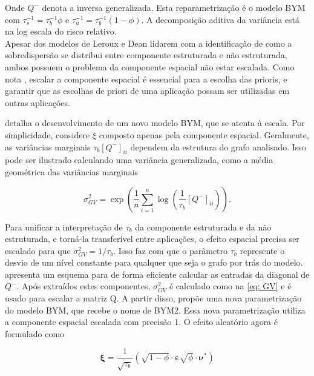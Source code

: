 Onde $Q^-$ denota a inversa generalizada. Esta reparametrização é o modelo BYM com $\tau_s^{-1} = \tau_b^{-1} \phi$ e $\tau_u^{-1} = \tau_b^{-1} (1 - \phi)$. A decomposição aditiva da variância está na log escala do risco relativo.\\

Apesar dos modelos de Leroux e Dean lidarem com a identificação de como a sobredispersão se distribui entre componente estruturada e não estruturada, ambos possuem o problema da componente espacial não estar escalada. Como nota \cite{SORBYE2014}, escalar a componente espacial é essencial para a escolha das prioris, e garantir que as escolhas de priori de uma aplicação possam ser utilizadas em outras aplicações. 

\cite{Ribler2019} detalha o desenvolvimento de um novo modelo BYM, que se atenta à escala. Por simplicidade, considere $\xi$ composto apenas pela componente espacial. Geralmente, as variâncias marginais $\tau_b [Q^-]_{ii}$ dependem da estrutura do grafo analisado. Isso pode ser ilustrado calculando uma variância generalizada, como a média geométrica das variâncias marginais

\begin{equation}\label{eq: GV}
    \sigma^2_{GV} = \exp \left( \frac{1}{n} \sum_{i=1}^n \log \left(  \frac{1}{\tau_b}[Q^-]_{ii}\right) \right).
\end{equation}

Para unificar a interpretação de $\tau_b$ da componente estruturada e da não estruturada, e torná-la transferível entre aplicações, o efeito espacial precisa ser escalado para que $\sigma^2_{GV} = 1/\tau_b$. Isso faz com que o parâmetro $\tau_b$ represente o desvio de um nível constante para qualquer que seja o grafo por trás do modelo. \cite{GMRF} apresenta um esquema para de forma eficiente calcular as entradas da diagonal de $Q^-$. Após extraídos estes componentes, $\sigma^2_{GV}$ é calculado como na \autoref{eq: GV} e é usado para escalar a matriz Q. A partir disso, \cite{Simpson2015}  propõe uma nova parametrização do modelo BYM, que recebe o nome de BYM2. Essa nova parametrização utiliza a componente espacial escalada com precisão 1. O efeito aleatório agora é formulado como

\begin{equation}\label{eq: bym2err}
    \boldsymbol{\xi} = \frac{1}{\sqrt{\tau_b}} \left( \sqrt{1-\phi} \cdot \boldsymbol{\varepsilon} \sqrt{\phi} \cdot \boldsymbol{\nu}^* \right)
\end{equation}

